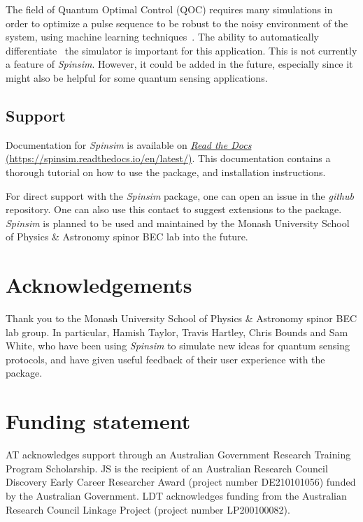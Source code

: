 \documentclass{jors}
\begin{document}
		The field of Quantum Optimal Control (QOC) requires many simulations in order to optimize a pulse sequence to be robust to the noisy environment of the system, using machine learning techniques~\cite{dalgaard_fast_2021}.
		The ability to automatically differentiate~\cite{griewank_who_2012} the simulator is important for this application.
		This is not currently a feature of \emph{Spinsim}.
		However, it could be added in the future, especially since it might also be helpful for some quantum sensing applications.

	\subsection{Support}
		Documentation for \emph{Spinsim} is available on \href{https://spinsim.readthedocs.io/en/latest/}{\emph{Read the Docs} (https://spinsim.readthedocs.io/en/latest/)}.
		This documentation contains a thorough tutorial on how to use the package, and installation instructions.
		
		For direct support with the \emph{Spinsim} package, one can open an issue in the \emph{github} repository.
		One can also use this contact to suggest extensions to the package.
		\emph{Spinsim} is planned to be used and maintained by the Monash University School of Physics \& Astronomy spinor BEC lab into the future.

\section{Acknowledgements}

Thank you to the Monash University School of Physics \& Astronomy spinor BEC lab group. In particular, Hamish Taylor, Travis Hartley, Chris Bounds and Sam White, who have been using \emph{Spinsim} to simulate new ideas for quantum sensing protocols, and have given useful feedback of their user experience with the package.

\section{Funding statement}

AT acknowledges support through an Australian Government Research Training Program Scholarship.
JS is the recipient of an Australian Research Council Discovery Early Career Researcher Award (project number DE210101056) funded by the Australian Government.
LDT acknowledges funding from the Australian Research Council Linkage Project (project number LP200100082).
\end{document}
